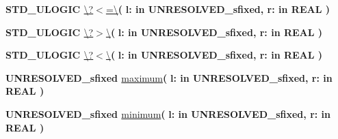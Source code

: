 \begin{DoxyCompactItemize}
\item 
{\bfseries {\bfseries \textcolor{comment}{S\+T\+D\+\_\+\+U\+L\+O\+G\+I\+C}\textcolor{vhdlchar}{ }}} \hyperlink{class__fixed__pkg_a271da29f659a2bc9480dbd29d7727913}{\textbackslash{}?$<$=\textbackslash{}}{\bfseries  ( }{\bfseries \textcolor{vhdlchar}{l\+: }\textcolor{stringliteral}{in }\textcolor{vhdlchar}{U\+N\+R\+E\+S\+O\+L\+V\+E\+D\+\_\+sfixed}}{\bfseries  , \textcolor{vhdlchar}{r\+: }\textcolor{stringliteral}{in }{\bfseries \textcolor{comment}{R\+E\+A\+L}\textcolor{vhdlchar}{ }}}{\bfseries  )} 
\item 
{\bfseries {\bfseries \textcolor{comment}{S\+T\+D\+\_\+\+U\+L\+O\+G\+I\+C}\textcolor{vhdlchar}{ }}} \hyperlink{class__fixed__pkg_a9e6b6b8c2c14da978e6f70cb6e85e6dc}{\textbackslash{}?$>$\textbackslash{}}{\bfseries  ( }{\bfseries \textcolor{vhdlchar}{l\+: }\textcolor{stringliteral}{in }\textcolor{vhdlchar}{U\+N\+R\+E\+S\+O\+L\+V\+E\+D\+\_\+sfixed}}{\bfseries  , \textcolor{vhdlchar}{r\+: }\textcolor{stringliteral}{in }{\bfseries \textcolor{comment}{R\+E\+A\+L}\textcolor{vhdlchar}{ }}}{\bfseries  )} 
\item 
{\bfseries {\bfseries \textcolor{comment}{S\+T\+D\+\_\+\+U\+L\+O\+G\+I\+C}\textcolor{vhdlchar}{ }}} \hyperlink{class__fixed__pkg_a7e98e66a4a282c529968f69f70dd16ad}{\textbackslash{}?$<$\textbackslash{}}{\bfseries  ( }{\bfseries \textcolor{vhdlchar}{l\+: }\textcolor{stringliteral}{in }\textcolor{vhdlchar}{U\+N\+R\+E\+S\+O\+L\+V\+E\+D\+\_\+sfixed}}{\bfseries  , \textcolor{vhdlchar}{r\+: }\textcolor{stringliteral}{in }{\bfseries \textcolor{comment}{R\+E\+A\+L}\textcolor{vhdlchar}{ }}}{\bfseries  )} 
\item 
{\bfseries {\bfseries \textcolor{vhdlchar}{U\+N\+R\+E\+S\+O\+L\+V\+E\+D\+\_\+sfixed}\textcolor{vhdlchar}{ }}} \hyperlink{class__fixed__pkg_a427ed4c94126ca4966f81712b325a314}{maximum}{\bfseries  ( }{\bfseries \textcolor{vhdlchar}{l\+: }\textcolor{stringliteral}{in }\textcolor{vhdlchar}{U\+N\+R\+E\+S\+O\+L\+V\+E\+D\+\_\+sfixed}}{\bfseries  , \textcolor{vhdlchar}{r\+: }\textcolor{stringliteral}{in }{\bfseries \textcolor{comment}{R\+E\+A\+L}\textcolor{vhdlchar}{ }}}{\bfseries  )} 
\item 
{\bfseries {\bfseries \textcolor{vhdlchar}{U\+N\+R\+E\+S\+O\+L\+V\+E\+D\+\_\+sfixed}\textcolor{vhdlchar}{ }}} \hyperlink{class__fixed__pkg_ac6e7f426014fe929a97c17a175463b51}{minimum}{\bfseries  ( }{\bfseries \textcolor{vhdlchar}{l\+: }\textcolor{stringliteral}{in }\textcolor{vhdlchar}{U\+N\+R\+E\+S\+O\+L\+V\+E\+D\+\_\+sfixed}}{\bfseries  , \textcolor{vhdlchar}{r\+: }\textcolor{stringliteral}{in }{\bfseries \textcolor{comment}{R\+E\+A\+L}\textcolor{vhdlchar}{ }}}{\bfseries  )} 

\end{DoxyCompactItemize}
